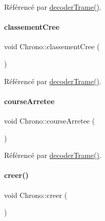 Référencé par \hyperlink{class_chrono_a9a66b4e81385e2c354805548b94cdfb6}{decoder\+Trame()}.

\mbox{\label{class_chrono_aea06e35eac092428e821a07a5e2df64c}} 
\paragraph{\texorpdfstring{classement\+Cree}{classementCree}}
{\footnotesize\ttfamily void Chrono\+::classement\+Cree (\begin{DoxyParamCaption}{ }\end{DoxyParamCaption})\hspace{0.3cm}{\ttfamily [signal]}}



Référencé par \hyperlink{class_chrono_a9a66b4e81385e2c354805548b94cdfb6}{decoder\+Trame()}.

\mbox{\label{class_chrono_a054799dc10e42daff8545689a61aea35}} 
\paragraph{\texorpdfstring{course\+Arretee}{courseArretee}}
{\footnotesize\ttfamily void Chrono\+::course\+Arretee (\begin{DoxyParamCaption}{ }\end{DoxyParamCaption})\hspace{0.3cm}{\ttfamily [signal]}}



Référencé par \hyperlink{class_chrono_a9a66b4e81385e2c354805548b94cdfb6}{decoder\+Trame()}.

\mbox{\label{class_chrono_a74d85a4e856e2e59afacaa061feb7b75}} 
\paragraph{\texorpdfstring{creer()}{creer()}}
{\footnotesize\ttfamily void Chrono\+::creer (\begin{DoxyParamCaption}{ }\end{DoxyParamCaption})}



